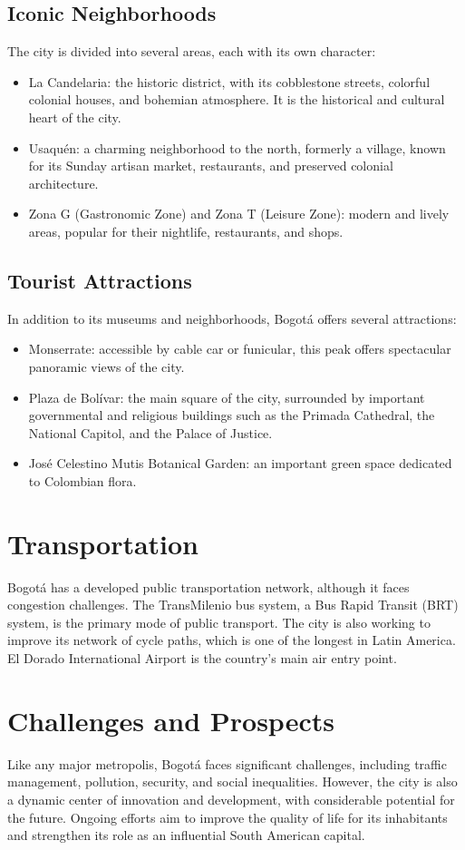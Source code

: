 \documentclass{article}
\begin{document}
\subsection{Iconic Neighborhoods}
The city is divided into several areas, each with its own character:
\begin{itemize}
    \item La Candelaria: the historic district, with its cobblestone streets, colorful colonial houses, and bohemian atmosphere. It is the historical and cultural heart of the city.    
    \item Usaquén: a charming neighborhood to the north, formerly a village, known for its Sunday artisan market, restaurants, and preserved colonial architecture.
    \item Zona G (Gastronomic Zone) and Zona T (Leisure Zone): modern and lively areas, popular for their nightlife, restaurants, and shops.
\end{itemize}

\subsection{Tourist Attractions}
In addition to its museums and neighborhoods, Bogotá offers several attractions:
\begin{itemize}
    \item Monserrate: accessible by cable car or funicular, this peak offers spectacular panoramic views of the city.
    \item Plaza de Bolívar: the main square of the city, surrounded by important governmental and religious buildings such as the Primada Cathedral, the National Capitol, and the Palace of Justice.
    \item José Celestino Mutis Botanical Garden: an important green space dedicated to Colombian flora.
\end{itemize}

\section{Transportation}
Bogotá has a developed public transportation network, although it faces congestion challenges. The TransMilenio bus system, a Bus Rapid Transit (BRT) system, is the primary mode of public transport. The city is also working to improve its network of cycle paths, which is one of the longest in Latin America. El Dorado International Airport is the country's main air entry point.

\section{Challenges and Prospects}
Like any major metropolis, Bogotá faces significant challenges, including traffic management, pollution, security, and social inequalities. However, the city is also a dynamic center of innovation and development, with considerable potential for the future. Ongoing efforts aim to improve the quality of life for its inhabitants and strengthen its role as an influential South American capital.
\end{document}
